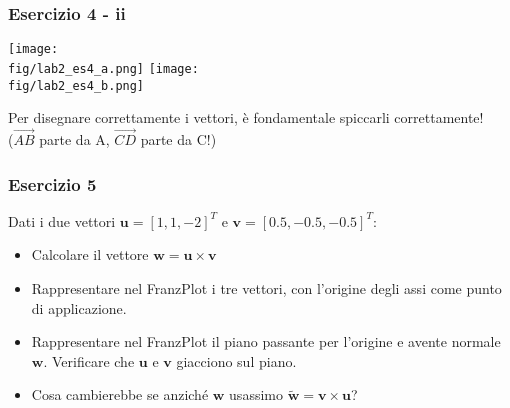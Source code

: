 \documentclass{beamer}
\newcommand{\fig}{figures} %
\newcommand{\frnzplt}{FranzPlot }
\begin{document}
\begin{frame}
\frametitle{Esercizio 4 - ii}
\vspace{-0.5cm}
\begin{center}
\texttt{[image: \\fig/lab2\_es4\_a.png]}
\texttt{[image: \\fig/lab2\_es4\_b.png]}
\end{center}
\vspace{-0.25cm}
Per disegnare correttamente i vettori, \`e fondamentale spiccarli correttamente!\\ ($\overrightarrow{AB}$ parte da A, $\overrightarrow{CD}$ parte da C!)
\end{frame}

\begin{frame}
\frametitle{Esercizio 5}
    Dati i due vettori $\mathbf{u} = [1, 1, -2]^T$ e $\mathbf{v} = [0.5, -0.5, -0.5]^T$:
\begin{itemize}
    \item Calcolare il vettore $\mathbf{w} = \mathbf u \times \mathbf v$
    \item Rappresentare nel \frnzplt i tre vettori, con l'origine degli assi come punto di applicazione.
    \item Rappresentare nel \frnzplt il piano passante per l'origine e avente normale $\mathbf w$.
        Verificare che $\mathbf u$ e $\mathbf v$ giacciono sul piano.
    \item Cosa cambierebbe se anzich\'e $\mathbf w$ usassimo $\tilde{\mathbf{w}} = \mathbf v \times \mathbf u$?
\end{itemize}
\end{frame}
\end{document}
